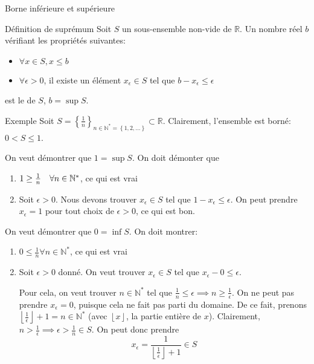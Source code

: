 \documentclass{article}
\begin{document}
\begin{parag}{Borne inférieure et supérieure}
    \begin{subparag}{Définition de suprémum}
        Soit $S$ un sous-ensemble non-vide de $\mathbb{R}$. Un nombre réel $b$ vérifiant les propriétés suivantes:
        \begin{itemize}
            \item $\forall x \in S, x \leq b$
            \item $\forall \epsilon > 0$, il existe un élément $x_{\epsilon} \in S$ tel que $b - x_{\epsilon} \leq \epsilon$
        \end{itemize}
        est le  de $S$, $b = \sup S$.
    \end{subparag}

    \begin{subparag}{Exemple}
        Soit $S = \left\{\frac{1}{n}\right\}_{n \in \mathbb{N}^* = \left\{1, 2, \ldots\right\}} \subset \mathbb{R}$. Clairement, l'ensemble est borné: $0 < S \leq 1$.

        On veut démontrer que $1 = \sup S$. On doit démonter que
        \begin{enumerate}
            \item $1 \geq \frac{1}{n} \quad \forall n \in \mathbb{N}^*$, ce qui est vrai
            \item Soit $\epsilon > 0$. Nous devons trouver $x_{\epsilon} \in S$ tel que $1 - x_{\epsilon} \leq \epsilon$.
        On peut prendre $x_{\epsilon} = 1$ pour tout choix de $\epsilon > 0$, ce qui est bon.
        \end{enumerate}

        On veut démontrer que $0 = \inf S$. On doit montrer:
        \begin{enumerate}
            \item $0 \leq \frac{1}{n} \forall n \in \mathbb{N}^*$, ce qui est vrai
            \item Soit $\epsilon > 0$ donné. On veut trouver $x_{\epsilon} \in S$ tel que $x_{\epsilon} - 0 \leq \epsilon$.

                Pour cela, on veut trouver $n \in \mathbb{N}^*$ tel que $\frac{1}{n} \leq \epsilon \implies n \geq \frac{1}{\epsilon}$. On ne peut pas prendre $x_{\epsilon} = 0$, puisque cela ne fait pas parti du domaine. De ce fait, prenons $\left\lfloor \frac{1}{\epsilon} \right\rfloor + 1 = n \in \mathbb{N}^*$ (avec $\left\lfloor x \right\rfloor $, la partie entière de $x$). Clairement, $n > \frac{1}{\epsilon} \implies \epsilon > \frac{1}{n} \in S$. On peut donc prendre
                \[x_{\epsilon} = \frac{1}{\left\lfloor \frac{1}{\epsilon} \right\rfloor + 1} \in S\]
        \end{enumerate}

    \end{subparag}

\end{parag}
\end{document}
